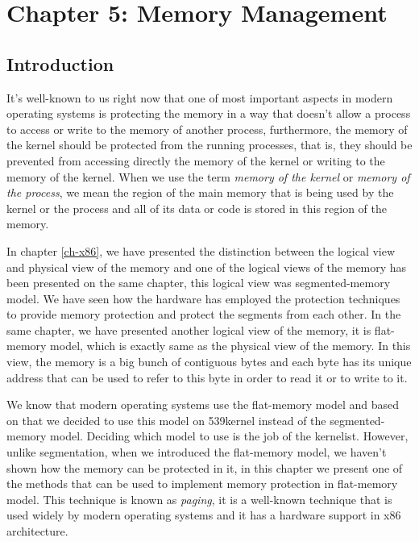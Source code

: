 \chapter{Chapter 5: Memory Management}\label{ch-memory-management}

\section{Introduction}\label{introduction}

It's well-known to us right now that one of most important aspects in
modern operating systems is protecting the memory in a way that doesn't
allow a process to access or write to the memory of another process,
furthermore, the memory of the kernel should be protected from the
running processes, that is, they should be prevented from accessing
directly the memory of the kernel or writing to the memory of the
kernel. When we use the term \emph{memory of the kernel} or \emph{memory
of the process}, we mean the region of the main memory that is being
used by the kernel or the process and all of its data or code is stored
in this region of the memory.

In chapter \ref{ch-x86}, we have presented the distinction between the
logical view and physical view of the memory and one of the logical
views of the memory has been presented on the same chapter, this logical
view was segmented-memory model. We have seen how the hardware has
employed the protection techniques to provide memory protection and
protect the segments from each other. In the same chapter, we have
presented another logical view of the memory, it is flat-memory model,
which is exactly same as the physical view of the memory. In this view,
the memory is a big bunch of contiguous bytes and each byte has its
unique address that can be used to refer to this byte in order to read
it or to write to it.

We know that modern operating systems use the flat-memory model and
based on that we decided to use this model on 539kernel instead of the
segmented-memory model. Deciding which model to use is the job of the
kernelist. However, unlike segmentation, when we introduced the
flat-memory model, we haven't shown how the memory can be protected in
it, in this chapter we present one of the methods that can be used to
implement memory protection in flat-memory model. This technique is
known as \emph{paging}, it is a well-known technique that is used widely
by modern operating systems and it has a hardware support in x86
architecture.

